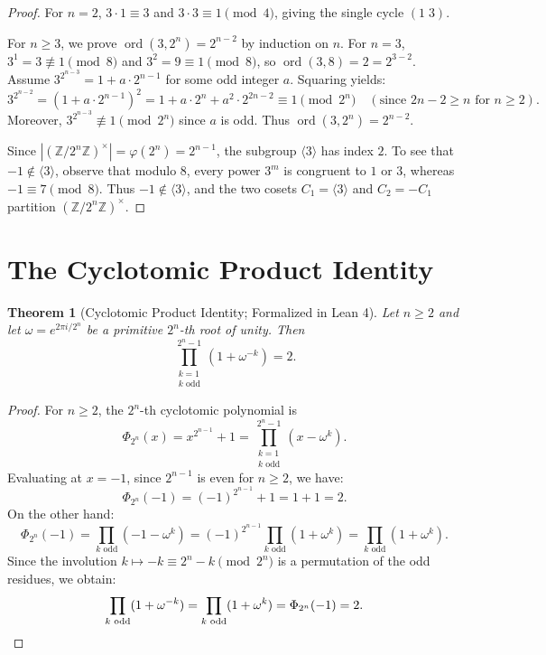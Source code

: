 \documentclass[11pt,reqno]{amsart}
\newtheorem{theorem}{Theorem}[section]
\theoremstyle{definition}
\begin{document}
\begin{proof}
For $n = 2$, $3 \cdot 1 \equiv 3$ and $3 \cdot 3 \equiv 1 \pmod 4$, giving the single cycle $(1 \; 3)$.

For $n \ge 3$, we prove $\operatorname{ord}(3, 2^n) = 2^{n-2}$ by induction on $n$. For $n = 3$, $3^1 = 3 \not\equiv 1 \pmod 8$ and $3^2 = 9 \equiv 1 \pmod 8$, so $\operatorname{ord}(3, 8) = 2 = 2^{3-2}$. Assume $3^{2^{n-3}} = 1 + a \cdot 2^{n-1}$ for some odd integer $a$. Squaring yields:
\[
3^{2^{n-2}} = (1 + a \cdot 2^{n-1})^2 = 1 + a \cdot 2^n + a^2 \cdot 2^{2n-2} \equiv 1 \pmod{2^n} \quad (\text{since } 2n-2 \ge n \text{ for } n \ge 2).
\]
Moreover, $3^{2^{n-3}} \not\equiv 1 \pmod{2^n}$ since $a$ is odd. Thus $\operatorname{ord}(3, 2^n) = 2^{n-2}$.

Since $|(\mathbb{Z}/2^n\mathbb{Z})^\times| = \varphi(2^n) = 2^{n-1}$, the subgroup $\langle 3 \rangle$ has index $2$. To see that $-1 \notin \langle 3 \rangle$, observe that modulo $8$, every power $3^m$ is congruent to $1$ or $3$, whereas $-1 \equiv 7 \pmod 8$. Thus $-1 \notin \langle 3 \rangle$, and the two cosets $C_1 = \langle 3 \rangle$ and $C_2 = -C_1$ partition $(\mathbb{Z}/2^n\mathbb{Z})^\times$.
\end{proof}

\section{The Cyclotomic Product Identity}\label{sec:cyclotomic}

\begin{theorem}[Cyclotomic Product Identity; Formalized in Lean 4]\label{thm:cyclotomic}
Let $n \ge 2$ and let $\omega = e^{2\pi i / 2^n}$ be a primitive $2^n$-th root of unity. Then
\[
\prod_{\substack{k=1 \\ k \text{ odd}}}^{2^n - 1} (1 + \omega^{-k}) = 2.
\]
\end{theorem}

\begin{proof}
For $n \ge 2$, the $2^n$-th cyclotomic polynomial is
\[
\Phi_{2^n}(x) = x^{2^{n-1}} + 1 = \prod_{\substack{k=1 \\ k \text{ odd}}}^{2^n - 1} (x - \omega^k).
\]
Evaluating at $x = -1$, since $2^{n-1}$ is even for $n \ge 2$, we have:
\[
\Phi_{2^n}(-1) = (-1)^{2^{n-1}} + 1 = 1 + 1 = 2.
\]
On the other hand:
\[
\Phi_{2^n}(-1) = \prod_{k \text{ odd}} (-1 - \omega^k) = (-1)^{2^{n-1}} \prod_{k \text{ odd}} (1 + \omega^k) = \prod_{k \text{ odd}} (1 + \omega^k).
\]
Since the involution $k \mapsto -k \equiv 2^n - k \pmod{2^n}$ is a permutation of the odd residues, we obtain:
\[
\prod_{k \text{ odd}} (1 + \omega^{-k}) = \prod_{k \text{ odd}} (1 + \omega^k) = \Phi_{2^n}(-1) = 2. \qedhere
\]
\end{proof}
\end{document}
